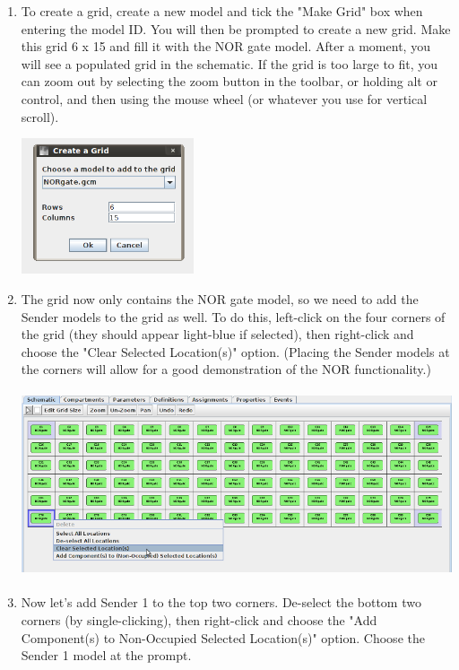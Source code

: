 \documentclass[titlepage,11pt]{article}
\begin{document}
\begin{enumerate}

\item To create a grid, create a new model and tick the "Make Grid" box when entering the model ID.  You will then be prompted to create a new grid.  Make this grid 6 x 15 and fill it with the NOR gate model.  After a moment, you will see a populated grid in the schematic.  If the grid is too large to fit, you can zoom out by selecting the zoom button in the toolbar, or holding alt or control, and then using the mouse wheel (or whatever you use for vertical scroll).  

\includegraphics[height=40mm]{screenshots/create_grid}

\item The grid now only contains the NOR gate model, so we need to add the Sender models to the grid as well.  To do this, left-click on the four corners of the grid (they should appear light-blue if selected), then right-click and choose the "Clear Selected Location(s)" option.  (Placing the Sender models at the corners will allow for a good demonstration of the NOR functionality.)

\includegraphics[height=55mm]{screenshots/clear_locations}

\item Now let's add Sender 1 to the top two corners.  De-select the bottom two corners (by single-clicking), then right-click and choose the "Add Component(s) to Non-Occupied Selected Location(s)" option.  Choose the Sender 1 model at the prompt.


\end{enumerate}
\end{document}

